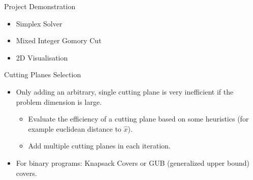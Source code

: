 \begin{frame}{Project Demonstration}
\begin{itemize}
\item Simplex Solver
\item Mixed Integer Gomory Cut
\item 2D Visualisation
\end{itemize}

%    
\end{frame}

\begin{frame}{Cutting Planes Selection}
\begin{itemize}[<+->]
\item Only adding an arbitrary, single cutting plane is very inefficient if the problem dimension is large.
\begin{itemize}
\item Evaluate the efficiency of a cutting plane based on some heuristics (for example euclidean distance to $\hat{x}$).
\item Add multiple cutting planes in each iteration.
\end{itemize}
\item For binary programs: Knapsack Covers or GUB (generalized upper bound) covers.
\end{itemize}
\end{frame}